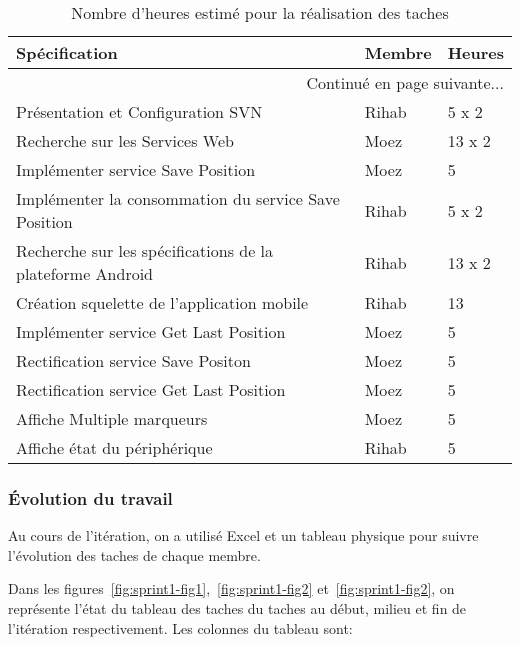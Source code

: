 \begin{center}
    \begin{longtable}{| l | l | l |}
        \caption{Nombre d'heures estimé pour la réalisation des taches}
        \label{tab:sprint1-estimation} \\

        \hline
        \textbf{Spécification} & \textbf{Membre} & \textbf{Heures} \\ \hline
        \endhead

        \hline \multicolumn{3}{|r|}{{Continué en page suivante$\dotsc$}} \\ \hline
        \endfoot

        \hline \hline
        \endlastfoot

        \hline
Présentation et Configuration SVN & Rihab & 5 x 2 \\ \hline
Recherche sur les Services Web & Moez & 13 x 2 \\ \hline
Implémenter service Save Position & Moez & 5 \\ \hline
Implémenter la consommation du service Save Position & Rihab & 5 x 2 \\ \hline
Recherche sur les spécifications de la plateforme Android & Rihab & 13 x 2 \\ \hline
Création squelette de l'application mobile & Rihab & 13 \\ \hline
Implémenter service Get Last Position & Moez & 5 \\ \hline
Rectification service Save Positon & Moez & 5 \\ \hline
Rectification service Get Last Position & Moez & 5 \\ \hline
Affiche Multiple marqueurs & Moez & 5 \\ \hline
Affiche état du périphérique & Rihab & 5 \\ \hline
    \end{longtable}
\end{center}

\subsubsection{Évolution du travail}

Au cours de l'itération, on a utilisé Excel et un tableau physique pour suivre
l'évolution des taches de chaque membre.

Dans les figures~\ref{fig:sprint1-fig1},~\ref{fig:sprint1-fig2}
et~\ref{fig:sprint1-fig2}, on représente l'état du tableau des taches du taches
au début, milieu et fin de l'itération respectivement. Les colonnes du tableau
sont:

